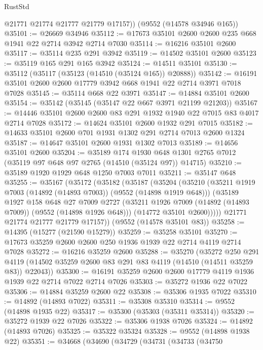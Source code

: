 \begin{lexlean}{RustStd}
\begin{coremodule}
        @21771
        @21774
        @21777
        @21779
        @17157))
    (@9552 (@14578 @34946 @165))
@35101 := @26669 @34946
@35112 := @17673 @35101 @2600 @2600 @235 @668 @1941 @22 @2714 @3942 @2714 @7030
@35114 := @16216 @35101 @2600
@35117 := @35114 @235 @291 @3942
@35119 := @14502 @35101 @2600
@35123 := @35119 @165 @291 @165 @3942
@35124 := @14511 @35101
@35130 := @35112 (@35117 (@35123 (@14510 (@35124 @165)) @20888))
@35142 := @16191 @35101 @2600 @2600 @17779 @3942 @668 @1941 @22 @2714 @3971 @7018 @7028
@35145 := @35114 @668 @22 @3971
@35147 := @14884 @35101 @2600
@35154 := @35142 (@35145 (@35147 @22 @667 @3971 @21199 @21203))
@35167 := @14446 @35101 @2600 @2600 @83 @291 @1932 @1940 @22 @7015 @83 @4017 @2714 @7028
@35172 := @14624 @35101 @2600 @1932 @291 @7015
@35182 := @14633 @35101 @2600 @701 @1931 @1302 @291 @2714 @7013 @2600 @1324
@35187 := @14647 @35101 @2600 @1931 @1302 @7013
@35189 := @14656 @35101 @2600
@35204 := @35189
    @174
    @1930
    @648
    @1301
    @2765
    @7012
    (@35119 @97 @648 @97 @2765 (@14510 (@35124 @97)) @14715)
@35210 := @35189 @1920 @1929 @648 @1250 @7003 @7011
@35211 := @35147 @648
@35255 := @35167
    (@35172
      (@35182
        (@35187
          (@35204
            (@35210
              (@35211 @1919 @7003 (@14892 (@14893 @7003)) (@9552 (@14898 @1919 @648)))
              (@35189
                @1927
                @158
                @648
                @27
                @7009
                @2727
                (@35211 @1926 @7009 (@14892 (@14893 @7009)) (@9552 (@14898 @1926 @648)))
                (@14772 @35101 @2600)))))
        @21771
        @21774
        @21777
        @21779
        @17157))
    (@9552 (@14578 @35101 @83))
@35258 := @14395 (@15277 (@21590 @15279))
@35259 := @35258 @35101
@35270 := @17673 @35259 @2600 @2600 @250 @1936 @1939 @22 @2714 @4119 @2714 @7028
@35272 := @16216 @35259 @2600
@35288 := @35270
    (@35272
      @250
      @291
      @4119
      (@14502 @35259 @2600 @83 @291 @83 @4119 (@14510 (@14511 @35259 @83)) @22043))
@35300 := @16191 @35259 @2600 @2600 @17779 @4119 @1936 @1939 @22 @2714 @7022 @2714 @7026
@35303 := @35272 @1936 @22 @7022
@35306 := @14884 @35259 @2600 @22
@35308 := @35306 @1935 @7022
@35310 := @14892 (@14893 @7022)
@35311 := @35308 @35310
@35314 := @9552 (@14898 @1935 @22)
@35317 := @35300 (@35303 (@35311 @35314))
@35320 := @35272 @1939 @22 @7026
@35322 := @35306 @1938 @7026
@35324 := @14892 (@14893 @7026)
@35325 := @35322 @35324
@35328 := @9552 (@14898 @1938 @22)
@35351 := @34668
    (@34690
      (@34729
        (@34731
          (@34733
            (@34750

\end{coremodule}
\end{lexlean}
